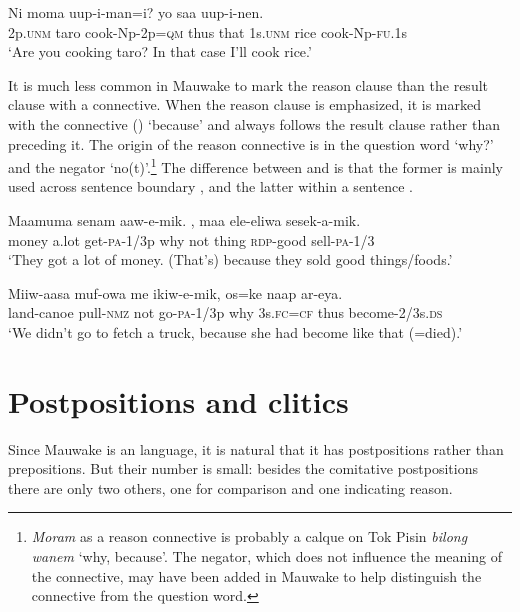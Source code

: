 \ea%
\label{ex:3:x737}
\gll Ni moma uup-i-man=i?   yo saa uup-i-nen.\\
2p.\textsc{unm} taro cook-Np-2p=\textsc{qm} thus that 1s.\textsc{unm} rice cook-Np-\textsc{fu}.1s\\
\glt`Are you cooking taro? In that case I'll cook rice.'
\z

It is much less common in Mauwake to mark the reason clause than the result clause with a connective. When the reason clause is emphasized, it is marked with the connective  () `because' and always follows the result clause rather than preceding it. The origin of the reason connective is in the question word  `why?' and the negator  `no(t)'.\footnote{\textit{Moram} as a reason connective is probably a calque on Tok Pisin \textit{bilong wanem} `why, because'. The negator, which does not influence the meaning of the connective, may have been added in Mauwake to help distinguish the connective from the question word.} The difference between  and  is that the former is mainly used across sentence boundary , and the latter within a sentence .

\ea%
\label{ex:3:x738}
\gll Maamuma senam aaw-e-mik.  , maa ele-eliwa sesek-a-mik. \\
money a.lot get-\textsc{pa}-1/3p why not thing \textsc{rdp}-good sell-\textsc{pa}-1/3\\
\glt`They got a lot of money. (That's) because they sold good things/foods.'
\z

\ea%
\label{ex:3:x739}
\gll Miiw-aasa muf-owa me ikiw-e-mik,  os=ke naap ar-eya.\\
land-canoe pull-\textsc{nmz} not go-\textsc{pa}-1/3p why 3s.\textsc{fc}=\textsc{cf} thus become-2/3s.\textsc{ds}\\
\glt`We didn't go to fetch a truck, because she had become like that (=died).'
\z

\section{Postpositions and clitics}\label{sec:3:12}
{}
Since Mauwake is an  language, it is natural that it has postpositions rather than prepositions. But their number is small: besides the comitative postpositions there are only two others, one for comparison and one indicating reason.

